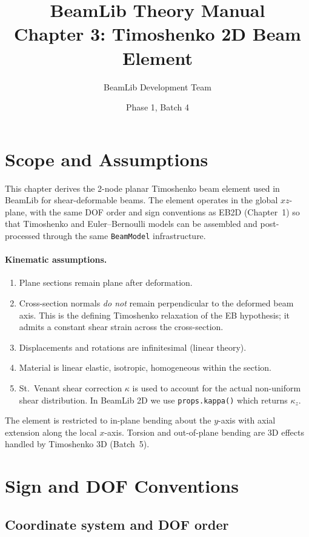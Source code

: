 \documentclass[11pt,a4paper]{article}
\title{BeamLib Theory Manual \\ Chapter 3: Timoshenko 2D Beam Element}
\author{BeamLib Development Team}
\date{Phase 1, Batch 4}
\begin{document}
\maketitle

\section{Scope and Assumptions}

This chapter derives the 2-node planar Timoshenko beam element used in BeamLib for shear-deformable beams. The element operates in the global $xz$-plane, with the same DOF order and sign conventions as EB2D (Chapter~1) so that Timoshenko and Euler--Bernoulli models can be assembled and post-processed through the same \texttt{BeamModel} infrastructure.

\paragraph{Kinematic assumptions.}
\begin{enumerate}
    \item Plane sections remain plane after deformation.
    \item Cross-section normals \emph{do not} remain perpendicular to the deformed beam axis. This is the defining Timoshenko relaxation of the EB hypothesis; it admits a constant shear strain across the cross-section.
    \item Displacements and rotations are infinitesimal (linear theory).
    \item Material is linear elastic, isotropic, homogeneous within the section.
    \item St.\ Venant shear correction $\kappa$ is used to account for the actual non-uniform shear distribution. In BeamLib 2D we use \texttt{props.kappa()} which returns $\kappa_z$.
\end{enumerate}

The element is restricted to in-plane bending about the $y$-axis with axial extension along the local $x$-axis. Torsion and out-of-plane bending are 3D effects handled by Timoshenko 3D (Batch~5).

\section{Sign and DOF Conventions}\label{sec:signs}

\subsection{Coordinate system and DOF order}
\end{document}
